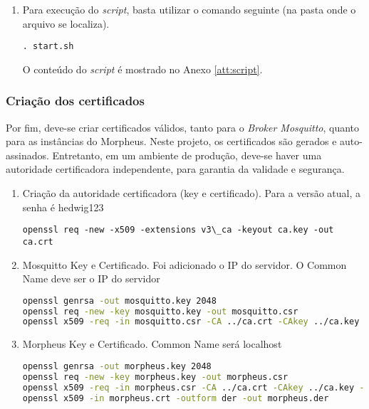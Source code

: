 \begin{enumerate}
\textbf{passwd}

\begin{lstlisting}[language=bash]
    0002D3D7:135876
    01344682:374028
    000750A1:524708
    001A1B07:321115
    0014BB3E:147203
    asd561asd5asd984faee:852456987
\end{lstlisting}

\item Para execução do \emph{script}, basta utilizar o comando seguinte (na pasta onde o arquivo se localiza).

\lstinline{. start.sh}

O conteúdo do \emph{script} é mostrado no Anexo \ref{att:script}.
\end{enumerate}

\subsubsection{Criação dos certificados}

Por fim, deve-se criar certificados válidos, tanto para o \emph{Broker Mosquitto}, quanto para as instâncias do Morpheus. Neste projeto, os certificados são gerados e auto-assinados. Entretanto, em um ambiente de produção, deve-se haver uma autoridade certificadora independente, para garantia da validade e segurança.

\begin{enumerate}
\item
Criação da autoridade certificadora (key e certificado). Para a versão atual, a senha é hedwig123

\lstinline{openssl req -new -x509 -extensions v3\_ca -keyout ca.key -out ca.crt}
\item
Mosquitto Key e Certificado. Foi adicionado o IP do servidor. O Common Name deve ser o IP do servidor

\begin{lstlisting}[language=bash]
openssl genrsa -out mosquitto.key 2048
openssl req -new -key mosquitto.key -out mosquitto.csr
openssl x509 -req -in mosquitto.csr -CA ../ca.crt -CAkey ../ca.key -CAcreateserial -out mosquitto.crt -days 3650 -sha256
\end{lstlisting}

\item
Morpheus Key e Certificado. Common Name será localhost

\begin{lstlisting}[language=bash]
openssl genrsa -out morpheus.key 2048
openssl req -new -key morpheus.key -out morpheus.csr
openssl x509 -req -in morpheus.csr -CA ../ca.crt -CAkey ../ca.key -CAcreateserial -out morpheus.crt -days 3650 -sha256 -addtrust clientAuth
openssl x509 -in morpheus.crt -outform der -out morpheus.der
\end{lstlisting}
\end{enumerate}

